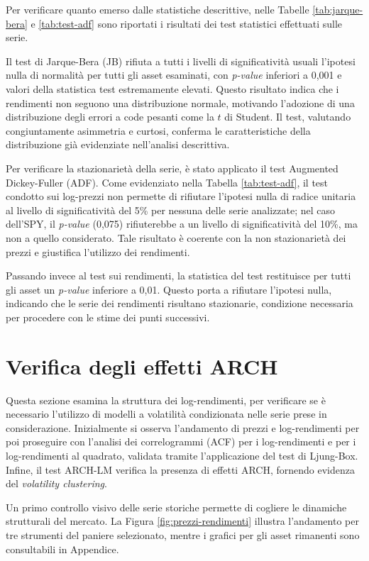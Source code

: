 Per verificare quanto emerso dalle statistiche descrittive, nelle Tabelle \ref{tab:jarque-bera} e \ref{tab:test-adf} sono riportati i risultati dei test statistici 
effettuati sulle serie.

Il test di Jarque-Bera (JB) rifiuta a tutti i livelli di significatività usuali l'ipotesi nulla di normalità per tutti gli asset esaminati, con \emph{p-value} inferiori 
a 0,001 e valori della statistica test estremamente elevati. Questo risultato indica che i rendimenti non seguono una distribuzione normale, motivando l'adozione di una 
distribuzione degli errori a code pesanti come la $t$ di Student. Il test, valutando congiuntamente asimmetria e curtosi, conferma le caratteristiche della distribuzione 
già evidenziate nell'analisi descrittiva.

Per verificare la stazionarietà della serie, è stato applicato il test Augmented Dickey-Fuller (ADF). Come evidenziato nella 
Tabella \ref{tab:test-adf}, il test condotto sui log-prezzi non permette di rifiutare l'ipotesi nulla di radice unitaria al livello di significatività del 5\% per nessuna 
delle serie analizzate; nel caso dell'SPY, il \emph{p-value} (0,075) rifiuterebbe a un livello di significatività del 10\%, ma non a quello considerato. 
Tale risultato è coerente con la non stazionarietà dei prezzi e giustifica l’utilizzo dei rendimenti.

Passando invece al test sui rendimenti, la statistica del test restituisce per tutti gli asset un \emph{p-value} inferiore a 0,01. Questo porta a rifiutare l'ipotesi nulla, 
indicando che le serie dei rendimenti risultano stazionarie, condizione necessaria per procedere con le stime dei punti successivi.


\section{Verifica degli effetti ARCH}
\label{sec:analisi-esplorativa}
Questa sezione esamina la struttura dei log-rendimenti, per verificare se è necessario l'utilizzo di modelli a volatilità condizionata nelle serie prese in considerazione. 
Inizialmente si osserva l'andamento di prezzi e log-rendimenti per poi proseguire con l'analisi dei correlogrammi (ACF) per i log-rendimenti e per i log-rendimenti al quadrato, 
validata tramite l'applicazione del test di Ljung-Box. Infine, il test ARCH-LM verifica la presenza di effetti ARCH, fornendo evidenza del \emph{volatility clustering}.

Un primo controllo visivo delle serie storiche permette di cogliere le dinamiche strutturali del mercato. La Figura \ref{fig:prezzi-rendimenti} illustra l'andamento per 
tre strumenti del paniere selezionato, mentre i grafici per gli asset rimanenti sono consultabili in Appendice. 


